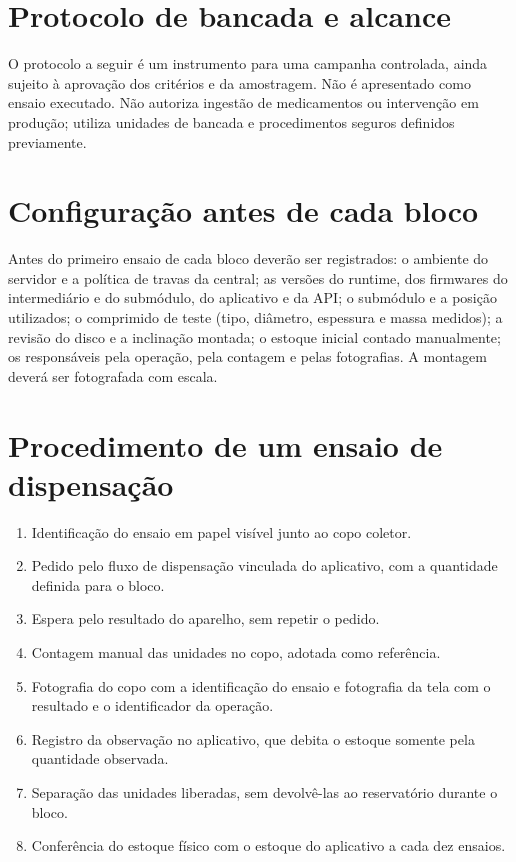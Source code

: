 \section{Protocolo de bancada e alcance}
O protocolo a seguir é um instrumento para uma campanha controlada, ainda sujeito à aprovação dos critérios e da amostragem. Não é apresentado como ensaio executado. Não autoriza ingestão de medicamentos ou intervenção em produção; utiliza unidades de bancada e procedimentos seguros definidos previamente.

\section{Configuração antes de cada bloco}
Antes do primeiro ensaio de cada bloco deverão ser registrados: o ambiente do servidor e a política de travas da central; as versões do runtime, dos firmwares do intermediário e do submódulo, do aplicativo e da API; o submódulo e a posição utilizados; o comprimido de teste (tipo, diâmetro, espessura e massa medidos); a revisão do disco e a inclinação montada; o estoque inicial contado manualmente; os responsáveis pela operação, pela contagem e pelas fotografias. A montagem deverá ser fotografada com escala.

\section{Procedimento de um ensaio de dispensação}
\begin{enumerate}
\item Identificação do ensaio em papel visível junto ao copo coletor.
\item Pedido pelo fluxo de dispensação vinculada do aplicativo, com a quantidade definida para o bloco.
\item Espera pelo resultado do aparelho, sem repetir o pedido.
\item Contagem manual das unidades no copo, adotada como referência.
\item Fotografia do copo com a identificação do ensaio e fotografia da tela com o resultado e o identificador da operação.
\item Registro da observação no aplicativo, que debita o estoque somente pela quantidade observada.
\item Separação das unidades liberadas, sem devolvê-las ao reservatório durante o bloco.
\item Conferência do estoque físico com o estoque do aplicativo a cada dez ensaios.
\end{enumerate}

